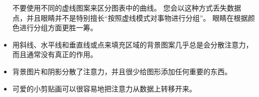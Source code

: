 \begin{itemize}
    不要使用不同的虚线图案来区分图表中的曲线。 您会以这种方式丢失数据点，并且眼睛并不是特别擅长``按照虚线模式对事物进行分组''。 眼睛在根据颜色进行分组方面更胜一筹。
    \item 用斜线、水平线和垂直线或点来填充区域的背景图案几乎总是会分散注意力，而且通常没有真正的作用。
    \item 背景图片和阴影分散了注意力，并且很少给图形添加任何重要的东西。
    \item 可爱的小剪贴画可以很容易地把注意力从数据上转移开来。
\end{itemize}

\clearpage